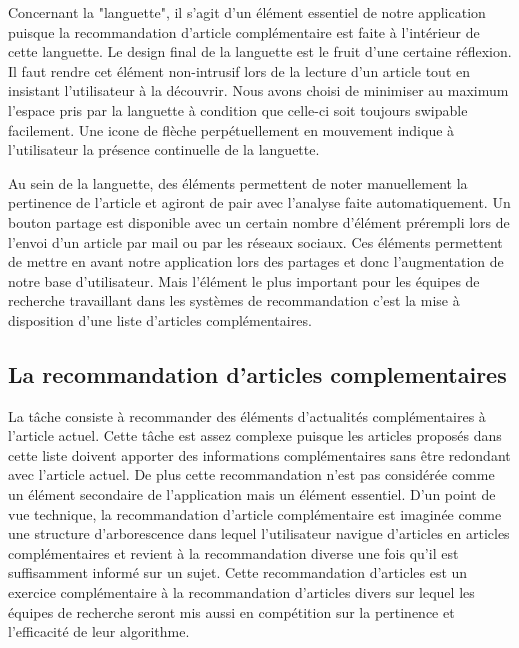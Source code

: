 Concernant la "languette", il s'agit d'un élément essentiel de notre application puisque la recommandation d'article complémentaire est faite à l'intérieur de cette languette. Le design final de la languette est le fruit d'une certaine réflexion. Il faut rendre cet élément non-intrusif lors de la lecture d'un article tout en insistant l'utilisateur à la découvrir. Nous avons choisi de minimiser au maximum l'espace pris par la languette à condition que celle-ci soit toujours swipable facilement. Une icone de flèche perpétuellement en mouvement indique à l'utilisateur la présence continuelle de la languette. 

Au sein de la languette, des éléments permettent de noter manuellement la pertinence de l'article et agiront de pair avec l'analyse faite automatiquement. Un bouton partage est disponible avec un certain nombre d'élément prérempli lors de l'envoi d'un article par mail ou par les réseaux sociaux. Ces éléments permettent de mettre en avant notre application lors des partages et donc l'augmentation de notre base d'utilisateur. Mais l'élément le plus important pour les équipes de recherche travaillant dans les systèmes de recommandation c'est la mise à disposition d'une liste d'articles complémentaires.


\subsection{La recommandation d'articles complementaires}


La tâche consiste à recommander des éléments d'actualités complémentaires à l'article actuel. Cette tâche est assez complexe puisque les articles proposés dans cette liste doivent apporter des informations complémentaires sans être redondant avec l'article actuel. De plus cette recommandation n'est pas considérée comme un élément secondaire de l'application mais un élément essentiel. D'un point de vue technique, la recommandation d'article complémentaire est imaginée comme une structure d'arborescence dans lequel l'utilisateur navigue d'articles en articles complémentaires et revient à la recommandation diverse une fois qu'il est suffisamment informé sur un sujet. Cette recommandation d'articles est un exercice complémentaire à la recommandation d'articles divers sur lequel les équipes de recherche seront mis aussi en compétition sur la pertinence et l'efficacité de leur algorithme.

